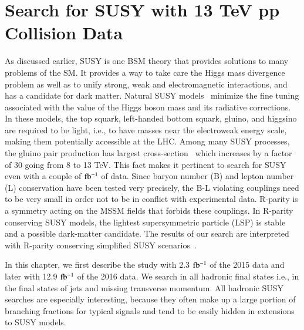 




\chapter{Search for SUSY with 13 TeV pp Collision Data  \label{Search for SUSY with 13 TeV pp Collision Data}}

As discussed earlier, SUSY is one BSM theory that provides solutions to many problems of the SM. It provides a way to take care the Higgs mass divergence problem as well as to unify strong, weak and electromagnetic interactions, and has a candidate for dark matter. Natural SUSY models~\cite{Naturaln} minimize the fine tuning associated with the value of the Higgs boson mass and its radiative corrections. In these models, the top squark, left-handed bottom squark, gluino, and higgsino are required to be light, i.e., to have masses near the electroweak energy scale, making them potentially accessible at the LHC. Among many SUSY processes, the gluino pair production has largest cross-section~\cite{xsecGlu} which increases by a factor of 30 going from 8 to 13 TeV. This fact makes it pertinent to search for SUSY even with a couple of $\rm fb^{-1}$ of data. Since baryon number (B) and lepton number (L) conservation have been tested very precisely, the B-L violating couplings need to be very small in order not to be in conflict with experimental data. R-parity is a symmetry acting on the MSSM fields that forbids these couplings. In R-parity conserving SUSY models, the lightest supersymmetric particle (LSP) is stable and a possible dark-matter candidate. The results of our search are interpreted with R-parity conserving simplified SUSY scenarios~\cite{SMS1}.


In this chapter, we first describe the study with 2.3 $\rm fb^{-1}$ of the 2015 data and later with 12.9 $\rm fb^{-1}$ of the 2016 data. We search in all hadronic final states i.e., in the final states of jets and missing transverse momentum. All hadronic SUSY searches are especially interesting, because they often make up a large portion of branching fractions for typical signals and tend to be easily hidden in extensions to  SUSY models.

